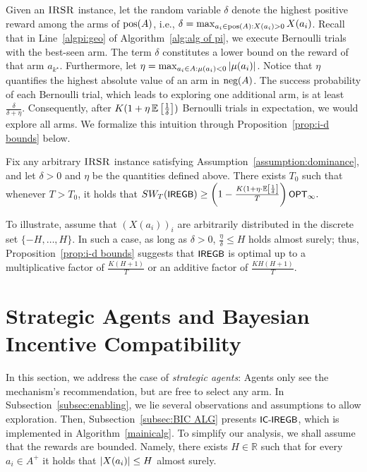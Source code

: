 Given an $\textsc{IRSR}$ instance, let the random variable $\delta$ denote the highest positive reward among the arms of $\textnormal{pos}(A)$, i.e., $\delta = \max_{a_i\in \textnormal{pos}(A): X(a_i)>0} X(a_i)$. Recall that in Line~\ref{algpi:geo} of Algorithm~\ref{alg:alg of pi}, we execute Bernoulli trials with the best-seen arm. The term $\delta$ constitutes a lower bound on the reward of that arm $a_{k^\star}$. Furthermore, let $\eta = \max_{a_i\in A:\mu(a_i)<0}\left| \mu(a_i) \right|$. Notice that $\eta$ quantifies the highest absolute value of an arm in $\textnormal{neg}(A)$. The success probability of each Bernoulli trial, which leads to exploring one additional arm, is at least 
$ \frac{\delta}{\delta+\eta}$. Consequently, after $K(1+{\eta}\operatorname{\mathbb{E}}\left[{\frac{1}{\delta}}\right])$ Bernoulli trials in expectation, we would explore all arms. We formalize this intuition through Proposition~\ref{prop:i-d bounds} below.
\begin{proposition}\label{prop:i-d bounds}
Fix any arbitrary $\textsc{IRSR}$ instance satisfying Assumption~\ref{assumption:dominance}, and let $\delta>0$ and $\eta$ be the quantities defined above. There exists $T_0$ such that whenever $T>T_0$, it holds that
$
SW_T({\small\textnormal{\textsf{IREGB}}}) \geq \left(  1-\frac{K(1+\eta\cdot \operatorname{\mathbb{E}}\left[{\frac{1}{\delta}}\right]}{T}\right) {\small\textnormal{\textsf{OPT}}}_\infty.
$
\end{proposition}
To illustrate, assume that $(X(a_i))_i$ are arbitrarily distributed in the discrete set $\{-H,\dots, H\}$. In such a case, as long as $\delta > 0$, $\frac{\eta}{\delta} \leq H$ holds almost surely; thus,  Proposition~\ref{prop:i-d bounds} suggests that ${\small\textnormal{\textsf{IREGB}}}$ is optimal up to a multiplicative factor of $\frac{K(H+1)}{T}$ or an additive factor of $\frac{KH(H+1)}{T}$.


\section{Strategic Agents and Bayesian Incentive Compatibility}\label{sec:ic body}
In this section, we address the case of \emph{strategic agents}: Agents only see the mechanism's recommendation, but are free to select any arm. In Subsection~\ref{subsec:enabling}, we lie several observations and assumptions to allow exploration. Then, Subsection~\ref{subsec:BIC ALG} presents ${\small\textnormal{\textsf{IC-IREGB}}}$, which is implemented in Algorithm~\ref{mainicalg}. To simplify our analysis, we shall assume that the rewards are bounded. Namely, there exists $H \in \mathbb R$ such that for every $a_i \in A^+$ it holds that $\left| X(a_i) \right| \leq H$ almost surely.

